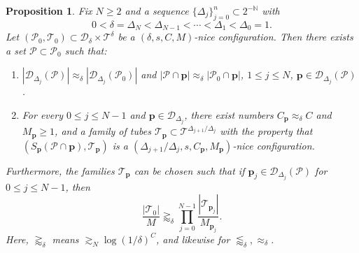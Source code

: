 \documentclass{amsart}
\newtheorem{prop}{Proposition}[section]
\newcommand{\N}{\mathbb{N}}
\newcommand{\T}{\mathcal{T}}
\newcommand{\leapp}{\lessapprox}
\newcommand{\geapp}{\gtrapprox}
\newcommand{\app}{\approx}
\newcommand{\gesim}{\gtrsim}
\newcommand{\cD}{\mathcal{D}}
\newcommand{\cT}{\mathcal{T}}
\newcommand{\cP}{\mathcal{P}}
\begin{document}
\begin{prop}\label{prop: OSincidence multiscale}
    Fix $N \ge 2$ and a sequence $\{ \Delta_j \}_{j=0}^n \subset 2^{-\N}$ with
    \begin{equation*}
        0 < \delta = \Delta_N < \Delta_{N-1} < \cdots < \Delta_1 < \Delta_0 = 1.
    \end{equation*}
    Let $(\cP_0, \cT_0) \subset \cD_\delta \times \T^\delta$ be a $(\delta, s, C, M)$-nice configuration. Then there exists a set $\cP \subset \cP_0$ such that:
    \begin{enumerate}
        \item $|\cD_{\Delta_j} (\cP)| \approx_\delta |\cD_{\Delta_j} (\cP_0)|$ and $|\cP \cap \textbf{p}| \approx_\delta |\cP_0 \cap \textbf{p}|$, $1 \leq j \leq N$, $\textbf{p} \in \cD_{\Delta_j} (\cP)$.
        \item For every $0 \leq j \leq N-1$ and $\textbf{p} \in \cD_{\Delta_j}$, there exist numbers $C_{\textbf{p}} \approx_\delta C$ and $M_{\textbf{p}} \geq 1$, and a family of tubes $\cT_{\textbf{p}} \subset \T^{\Delta_{j+1}/\Delta_j}$ with the property that $(S_{\textbf{p}} (\cP \cap \textbf{p}), \cT_{\textbf{p}})$ is a $(\Delta_{j+1}/\Delta_j, s, C_{\textbf{p}}, M_{\textbf{p}})$-nice configuration.
    \end{enumerate}

    Furthermore, the families $\cT_{\textbf{p}}$ can be chosen such that if $\textbf{p}_j \in \cD_{\Delta_j} (\cP)$ for $0 \le j \le N-1$, then
    \begin{equation*}
        \frac{|\cT_0|}{M} \geapp_\delta \prod_{j=0}^{N-1} \frac{|\cT_{\textbf{p}_j}|}{M_{\textbf{p}_j}}.
    \end{equation*}
    Here, $\geapp_\delta$ means $\gesim_N \log(1/\delta)^C$, and likewise for $\leapp_\delta, \app_\delta$.
\end{prop}























  
\end{document}
